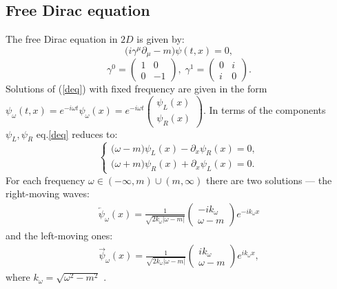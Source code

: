 \documentclass[12pt]{article}
\newcommand\beq{\begin{equation}}
\newcommand\eeq{\end{equation}}
\def\kw{k_{\omega}} \def\pw{p_{\omega}}
\def\psiw{\psi_{\omega}}
\def\psiwR{\overrightarrow{\psi}_{\omega}}
\def\psiwL{\overleftarrow{\psi}_{\omega}}
\numberwithin{equation}{section}
\begin{document}
\newpage
\begin{appendices} 
\setcounter{equation}{0}
\renewcommand\theequation{A.\arabic{equation}}

\section{Free Dirac equation}
The free Dirac equation in $2D$ is given by:
\beq
\label{deq}
    \Big(i\gamma^{\mu}\partial_{\mu}-m\Big)\psi(t,x)=0,
\eeq
\beq
    \gamma^{0} = \begin{pmatrix}
	1 & 0\\
	0 & -1
	\end{pmatrix}, \; \gamma^{1} = \begin{pmatrix}
	0 & i\\
	i & 0
	\end{pmatrix}.
\eeq 
Solutions of (\ref{deq}) with fixed frequency are given in the form $\psi_{\omega}(t,x)=e^{-i\omega t}\psiw(x) = e^{-i\omega t}\begin{pmatrix}
    \psi_L(x)\\
    \psi_R(x)
    \end{pmatrix}$. In terms of the components $\psi_L,\psi_R$ eq.\eqref{deq} reduces to: 
\begin{equation}
	\begin{cases}
	\big(\omega -m\big)\psi_L(x) - \partial_x \psi_R(x) = 0,\\
	\big(\omega +m\big)\psi_R(x) + \partial_x \psi_L(x) = 0.
	\end{cases}
\end{equation}    
For each frequency $\omega\in(-\infty,m)\cup (m,\infty)$ there are two solutions --- the right-moving waves:
\begin{gather}
\label{left free}
    \psiwL(x) = \frac{1}{\sqrt{2\kw\left|\omega-m\right|}}
    \begin{pmatrix}
        -i\kw \\
        \omega -m
    \end{pmatrix}e^{-i\kw x} 
\end{gather}
and the left-moving ones:
\begin{gather}
\label{right free}
    \psiwR(x) = \frac{1}{\sqrt{2\kw\left|\omega-m\right|}}
    \begin{pmatrix}
        i\kw \\
        \omega -m
    \end{pmatrix}e^{i\kw x} ,
\end{gather}
where $\kw=\sqrt{\omega^2-m^2}$ .


\end{appendices}
\end{document}

